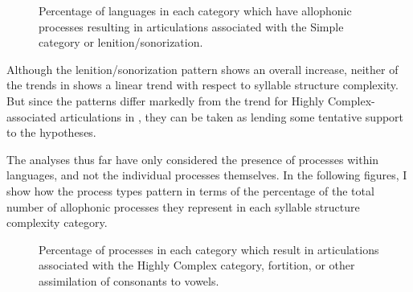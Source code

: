 \begin{figure}
\caption{\label{fig:7.3}Percentage of languages in each category which have allophonic processes resulting in articulations associated with the Simple category or lenition/sonorization.}
\end{figure}
  Although the lenition/sonorization pattern shows an overall increase, neither of the trends in  shows a linear trend with respect to syllable structure complexity. But since the patterns differ markedly from the trend for Highly Complex-associated articulations in , they can be taken as lending some tentative support to the hypotheses.

  The analyses thus far have only considered the presence of processes within languages, and not the individual processes themselves. In the following figures, I show how the process types pattern in terms of the percentage of the total number of allophonic processes they represent in each syllable structure complexity category.

\begin{figure}
\caption{\label{fig:7.4}Percentage of processes in each category which result in articulations associated with the Highly Complex category, fortition, or other assimilation of consonants to vowels.}
\end{figure}

